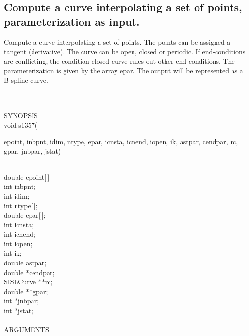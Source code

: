 \subsection{Compute a curve interpolating a set of points,
parameter\-ization as input.}
\begin{minipg1}
Compute a curve interpolating a set of points.  The points
can be assigned a tangent (derivative).  The curve can be open, closed
or periodic. If end-conditions are conflicting, the condition closed
curve rules out other end conditions. The parameterization is given by
the array {\fov epar}.
The output will be represented as a B-spline curve.
\end{minipg1} \\ \\
SYNOPSIS\\
        \>void s1357(\begin{minipg3}
        {\fov epoint}, {\fov inbpnt}, {\fov idim}, {\fov ntype}, {\fov epar}, {\fov icnsta}, {\fov icnend}, {\fov iopen}, {\fov ik}, {\fov astpar},
        {\fov cendpar}, {\fov rc}, {\fov gpar}, {\fov jnbpar}, {\fov jstat})
        \end{minipg3}\\[0.3ex]
        \>\>    double \>  {\fov epoint}[\,];\\
        \>\>    int    \>  {\fov inbpnt};\\
        \>\>    int    \>  {\fov idim};\\
        \>\>    int    \>  {\fov ntype}[\,];\\
        \>\>    double \>  {\fov epar}[\,];\\
        \>\>    int    \>  {\fov icnsta};\\
        \>\>    int    \>  {\fov icnend};\\
        \>\>    int    \>  {\fov iopen};\\
        \>\>    int    \>  {\fov ik};\\
        \>\>    double \>  {\fov astpar};\\
        \>\>    double \>  *{\fov cendpar};\\
        \>\>    SISLCurve \> **{\fov rc};\\
        \>\>    double \>  **{\fov gpar};\\
        \>\>    int    \>  *{\fov jnbpar};\\
        \>\>    int    \>  *{\fov jstat};\\
\\
ARGUMENTS\\
